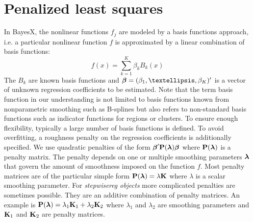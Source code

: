 \documentclass[11pt,a4paper,twoside]{bayesxarticle}
\begin{document}
%
\section{Penalized least squares}
\label{penalizedleastsquares}

In BayesX, the nonlinear functions $f_j$ are modeled by a basis
functions approach, i.e. a particular nonlinear function $f$ is
approximated by a linear combination of basis functions:
$$
f(x) = \sum_{k=1}^{K} \beta_k B_k(x)
$$
The $B_k$ are known basis functions and $\betavec =
(\beta_1,\dots,\beta_K)'$ is a vector of unknown regression
coefficients to be estimated. Note that the term basis function in
our understanding is not limited to basis functions known from
nonparametric smoothing such as B-splines but also refers to
non-standard basis functions such as indicator functions for regions
or clusters. To ensure enough flexibility, typically a large number
of basis functions is defined. To avoid overfitting, a roughness
penalty on the regression coefficients is additionally specified. We
use quadratic penalties of the form $\boldsymbol{\beta}' \mathbf{P}(\boldsymbol{\lambda})
\boldsymbol{\beta}$ where $\mathbf{P}(\boldsymbol{\lambda})$ is a penalty matrix. The penalty
depends on one or multiple smoothing parameters $\boldsymbol{\lambda}$ that
govern the amount of smoothness imposed on the function $f$. Most
penalty matrices are of the particular simple form
$\mathbf{P}(\boldsymbol{\lambda}) = \lambda \mathbf{K}$ where $\lambda$ is a scalar
smoothing parameter. For {\em stepwisereg objects} more complicated
penalties are sometimes possible. They are an additive combination
of penalty matrices. An example is $\mathbf{P}(\boldsymbol{\lambda}) = \lambda_1
\mathbf{K}_1+\lambda_2 \mathbf{K}_2$ where $\lambda_1$ and $\lambda_2$ are
smoothing parameters and $\mathbf{K}_1$ and $\mathbf{K}_2$ are penalty
matrices.
\end{document}
